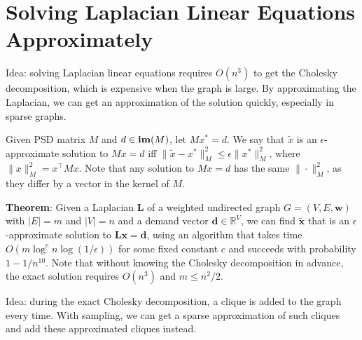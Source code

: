 \section{Solving Laplacian Linear Equations Approximately}

Idea: solving Laplacian linear equations requires $O(n^3)$ to get the Cholesky decomposition, which is expensive when the graph is large. By approximating the Laplacian, we can get an approximation of the solution quickly, especially in sparse graphs.

Given PSD matrix $M$ and $d \in \operatorname{\textbf{im}}(M)$, let $M x^* = d$. We say that $\tilde{x}$ is an $\epsilon$-approximate solution to $Mx=d$ iff $\|\tilde{x} - x^*\|_M^2 \le \epsilon \|x^*\|_M^2$, where $\|x\|_M^2 = x^\top M x$. Note that any solution to $M x = d$ has the same $\|\cdot\|_M^2$, as they differ by a vector in the kernel of $M$.

\textbf{Theorem}: Given a Laplacian $\boldsymbol{L}$ of a weighted undirected graph $G=(V, E, \boldsymbol{w})$ with $|E|=m$ and $|V|=n$ and a demand vector $\boldsymbol{d} \in \mathbb{R}^{V}$, we can find $\tilde{\boldsymbol{x}}$ that is an $\epsilon$-approximate solution to $\boldsymbol{L x}=\boldsymbol{d}$, using an algorithm that takes time $O\left(m \log ^{c} n \log (1 / \epsilon)\right)$ for some fixed constant $c$ and succeeds with probability $1-1 / n^{10}$. Note that without knowing the Cholesky decomposition in advance, the exact solution requires $O(n^3)$ and $m \le n^2 / 2$.

Idea: during the exact Cholesky decomposition, a clique is added to the graph every time. With sampling, we can get a sparse approximation of such cliques and add these approximated cliques instead.